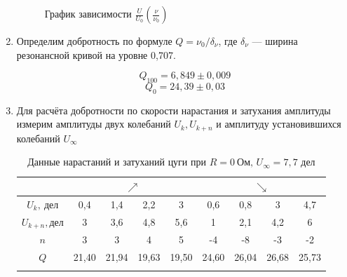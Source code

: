 \documentclass[a4paper, 12pt]{article}%
\begin{document}
\begin{enumerate}
\begin{longtable} {|c|c|c|c|c|c|c|c|c|c|c|c|}
		\end{longtable}
		\begin{figure}[H]
			\caption{График зависимости $\frac{U}{U_0}(\frac{\nu}{\nu_0})$}
		\end{figure}
		
		
		\item Определим добротность по формуле $Q = \nu_0/\delta_{\nu}$, где $\delta_{\nu}$ — ширина резонансной кривой на уровне 0,707.
		
		
		$$ Q_{100} = 6,849 \pm 0,009$$
		$$ Q_0 = 24,39\pm 0,03 $$
		
		\item Для расчёта добротности по скорости нарастания и затухания амплитуды измерим амплитуды двух колебаний $U_k, U_{k+n}$ и амплитуду установившихся колебаний $U_{\infty}$
		
		
		\begin{longtable}{|c|c|c|c|c|c|c|c|c|}  \hline
			{} & \multicolumn{4}{|c|}{$\nearrow$} & \multicolumn{4}{|c|}{$\searrow$} \\\hline
			$U_k,\ \text{дел}$ & 0,4 & 1,4 & 2,2 & 3 & 0,6 & 0,8 & 3 & 4,7 \\\hline
			$U_{k+n}, \text{дел}$ & 3 & 3,6 & 4,8 & 5,6 & 1 & 2,1 & 4,2 & 6 \\\hline
			$n$ & 3 & 3 & 4 & 5 & -4 & -8 & -3 & -2 \\\hline
			$Q$ & 21,40 & 21,94 & 19,63 & 19,50 & 24,60 & 26,04 & 26,68 & 25,73 \\\hline
			\caption{Данные нарастаний и затуханий цуги при $R = 0\ \text{Ом, } U_{\infty} = 7,7$ дел}
		\end{longtable}
		

\end{enumerate}
\end{document}
